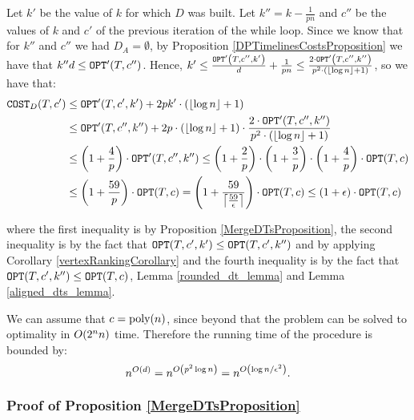 Let $k'$ be the value of $k$ for which $D$ was built. Let $k''=k-\frac{1}{pn}$ and $c''$ be the values of $k$ and $c'$ of the previous iteration of the while loop. Since we know that for $k''$ and $c''$ we had $D_A=\emptyset$, by Proposition \ref{DPTimelinesCostsProposition} we have that $k'' d \leq \OPT'\br{T,c''}$. Hence,
 $k'\leq \frac{\OPT'\br{T,c'',k'}}{d}+\frac{1}{pn}\leq\frac{2\cdot \OPT'\br{T,c'',k''}}{p^2\cdot\br{\fl{\log n}+1}}$, so we have that:
\begin{align*}
    \COST_{D}\br{T,c'}&\leq \OPT'\br{T,c',k'}+2pk'\cdot \br{\fl{\log n}+1}
    \\&\leq \OPT'\br{T,c'',k''}+2p\cdot \br{\fl{\log n}+1}\cdot \frac{2\cdot\OPT'\br{T,c'', k''}}{p^2\cdot\br{\fl{\log n}+1}} \\
    & \leq \br{1+\frac{4}{p}}\cdot\OPT'\br{T,c'',k''}\leq \br{1+\frac{2}{p}}\cdot\br{1+\frac{3}{p}}\cdot\br{1+\frac{4}{p}}\cdot\OPT\br{T,c}
    \\&
    \leq \br{1+\frac{59}{p}}\cdot\OPT\br{T,c} = \br{1+\frac{59}{\cl{\frac{59}{\epsilon}}}}\cdot\OPT\br{T,c}\leq \br{1+\epsilon}\cdot \OPT\br{T,c}
\end{align*}
    
where the first inequality is by Proposition \ref{MergeDTsProposition}, the second inequality is by the fact that $\OPT\br{T,c',k'}\leq \OPT\br{T,c',k''}$ and by applying Corollary \ref{vertexRankingCorollary} and the fourth inequality is by the fact that $\OPT\br{T,c',k''}\leq \OPT\br{T,c}$, Lemma \ref{rounded_dt_lemma} and Lemma \ref{aligned_dts_lemma}.

We can assume that $c=\text{poly}\br{n}$, since beyond that the problem can be solved to optimality in $O\br{2^nn}$ time. Therefore the running time of the procedure is bounded by:
$$
n^{O\br{d}}=n^{O\br{p^2\log n}}=n^{O\br{\log n/\epsilon^2}}.
$$
\subsubsection{Proof of Proposition \ref{MergeDTsProposition}}


% 

